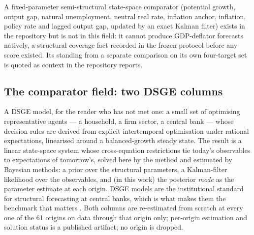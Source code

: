 \documentclass[11pt,a4paper]{article}
\newcommand{\code}[1]{\texttt{\detokenize{#1}}}
\begin{document}
A fixed-parameter semi-structural state-space comparator (potential growth, output gap, natural
unemployment, neutral real rate, inflation anchor, inflation, policy rate and lagged output gap,
updated by an exact Kalman filter) exists in the repository but is not in this field: it cannot
produce GDP-deflator forecasts natively, a structural coverage fact recorded in the frozen
protocol before any score existed. Its standing from a separate comparison on its own four-target
set is quoted as context in the repository reports.

\subsection{The comparator field: two DSGE columns}
\label{sec:design-dsge}

A DSGE model, for the reader who has not met one: a small set of optimising representative agents
--- a household, a firm sector, a central bank --- whose decision rules are derived from explicit
intertemporal optimisation under rational expectations, linearised around a balanced-growth
steady state. The result is a linear state-space system whose cross-equation restrictions tie
today's observables to expectations of tomorrow's, solved here by the \citet{sims2002}
\code{gensys} method and estimated by Bayesian methods: a prior over the structural parameters,
a Kalman-filter likelihood over the observables, and (in this work) the posterior \emph{mode} as
the parameter estimate at each origin. DSGE models are the institutional standard for structural
forecasting at central banks, which is what makes them the benchmark that matters
\citep{smetswouters2007}. Both columns are re-estimated from scratch at every one of the 61
origins on data through that origin only; per-origin estimation and solution status is a
published artifact; no origin is dropped.
\end{document}
